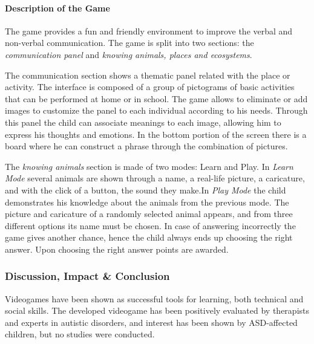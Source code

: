 \documentclass[runningheads]{llncs}
\begin{document}
\paragraph{Description of the Game} The game provides a fun and friendly environment to improve the verbal and non-verbal communication. The game is split into two sections: the \textit{communication panel} and \textit{knowing animals, places and ecosystems}.
\par The communication section shows a thematic panel related with the place or activity. The interface is composed of a group of pictograms of basic activities that can be performed at home or in school. The game allows to eliminate or add images to customize the panel to each individual according to his needs. Through this panel the child can associate meanings to each image, allowing him to express his thoughts and emotions. In the bottom portion of the screen there is a board where he can construct a phrase through the combination of pictures.
\par The \textit{knowing animals} section is made of two modes: Learn and Play. In \textit{Learn Mode} several animals are shown through a name, a real-life picture, a caricature, and with the click of a button, the sound they make.In \textit{Play Mode} the child demonstrates his knowledge about the animals from the previous mode. The picture and caricature of a randomly selected animal appears, and from three different options its name must be chosen. In case of answering incorrectly the game gives another chance, hence the child always ends up choosing the right answer. Upon choosing the right answer points are awarded.

\subsubsection{Discussion, Impact \& Conclusion}
\par Videogames have been shown as successful tools for learning, both technical and social skills. The developed videogame has been positively evaluated by therapists and experts in autistic disorders, and interest has been shown by ASD-affected children, but no studies were conducted.
\end{document}
